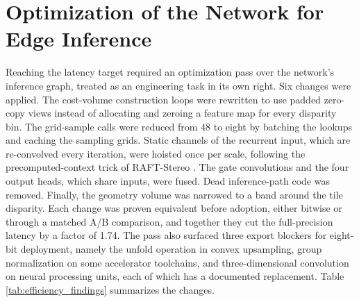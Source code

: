 \section{Optimization of the Network for Edge Inference}
Reaching the latency target required an optimization pass over the
network's inference graph, treated as an engineering task in its own
right. Six changes were applied. The cost-volume construction loops were
rewritten to use padded zero-copy views instead of allocating and zeroing
a feature map for every disparity bin. The grid-sample calls were reduced
from 48 to eight by batching the lookups and caching the sampling grids.
Static channels of the recurrent input, which are re-convolved every
iteration, were hoisted once per scale, following the precomputed-context
trick of RAFT-Stereo \cite{lipson2021raftstereo}. The gate convolutions
and the four output heads, which share inputs, were fused. Dead
inference-path code was removed. Finally, the geometry volume was narrowed
to a band around the tile disparity. Each change was proven equivalent
before adoption, either bitwise or through a matched A/B comparison, and
together they cut the full-precision latency by a factor of 1.74. The pass
also surfaced three export blockers for eight-bit deployment, namely the
unfold operation in convex upsampling, group normalization on some
accelerator toolchains, and three-dimensional convolution on neural
processing units, each of which has a documented replacement.
Table \ref{tab:efficiency_findings} summarizes the changes.


